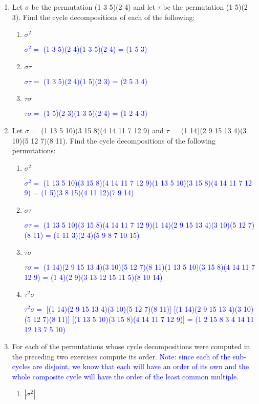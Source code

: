 \documentclass[10pt,a4paper]{report}
\newcommand{\BLUE}[1]{\textcolor{blue}{#1}}
\begin{document}
\begin{enumerate}

\item Let $\sigma$ be the permutation (1 3 5)(2 4) and let $\tau$ be the permutation (1 5)(2 3).  Find the cycle decompositions of each of the following:
\begin{enumerate}
	\item $\sigma^2$
	
	\BLUE{$\sigma^2 =$ (1 3 5)(2 4)(1 3 5)(2 4) = (1 5 3)}
	
	\item $\sigma\tau$
	
	\BLUE{$\sigma\tau =$ (1 3 5)(2 4)(1 5)(2 3) = (2 5 3 4)}
	
	\item $\tau\sigma$
	
	\BLUE{$\tau\sigma =$ (1 5)(2 3)(1 3 5)(2 4) = (1 2 4 3)}
	
\end{enumerate}

\item Let $\sigma = $ (1 13 5 10)(3 15 8)(4 14 11 7 12 9) and $\tau = $ (1 14)(2 9 15 13 4)(3 10)(5 12 7)(8 11).  Find the cycle decompositions of the following permutations:
\begin{enumerate}
	\item $\sigma^2$
	
	\BLUE{$\sigma^2 =$ (1 13 5 10)(3 15 8)(4 14 11 7 12 9)(1 13 5 10)(3 15 8)(4 14 11 7 12 9) = (1 5)(3 8 15)(4 11 12)(7 9 14)}
	
	\item $\sigma\tau$
	
	\BLUE{$\sigma\tau = $ (1 13 5 10)(3 15 8)(4 14 11 7 12 9)(1 14)(2 9 15 13 4)(3 10)(5 12 7)(8 11) = (1 11 3)(2 4)(5 9 8 7 10 15)}
	
	\item $\tau \sigma$
	
	\BLUE{$\tau \sigma = $ (1 14)(2 9 15 13 4)(3 10)(5 12 7)(8 11)(1 13 5 10)(3 15 8)(4 14 11 7 12 9) = (1 4)(2 9)(3 13 12 15 11 5)(8 10 14)}
	
	\item $\tau^2\sigma$
	
	\BLUE{$\tau^2\sigma =$ [(1 14)(2 9 15 13 4)(3 10)(5 12 7)(8 11)] [(1 14)(2 9 15 13 4)(3 10)(5 12 7)(8 11)] [(1 13 5 10)(3 15 8)(4 14 11 7 12 9)] = (1 2 15 8 3 4 14 11 12 13 7 5 10)}
\end{enumerate}

\item For each of the permutations whose cycle decompositions were computed in the preceding two exercises compute its order.  \BLUE{Note: since each of the sub-cycles are disjoint, we know that each will have an order of its own and the whole composite cycle will have the order of the least common multiple.}
\begin{enumerate}
	\item $|\sigma^2|$
	

\end{enumerate}
\end{enumerate}
\end{document}
